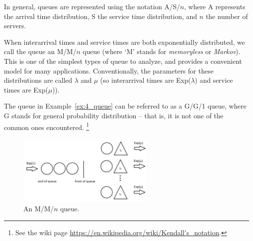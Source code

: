 In general, queues are represented using the notation A/S/$n$, where A represents the arrival time distribution, S the service time distribution, and $n$ the number of servers.

When interarrival times and service times are both exponentially distributed, we call the queue an M/M/$n$ queue (where `M' stands for \emph{memoryless} or \emph{Markov}).
This is one of the simplest types of queue to analyze, and provides a convenient model for many applications.
Conventionally, the parameters for these distributions are called $\lambda$ and $\mu$ (so interarrival times are Exp($\lambda$) and service times are Exp($\mu$)).


The queue in Example~\ref{ex:4_queue} can be referred to as a G/G/1 queue, where G stands for general probability distribution -- that is, it is not one of the common ones encountered.
\footnote{See the wiki page \url{https://en.wikipedia.org/wiki/Kendall's\_notation}.}

\begin{figure}[htbp]
	\centering
	\includegraphics[width=0.6\textwidth]{fig/4_queuepaintMMn.png}
	\caption{An M/M/$n$ queue. \label{fig:4_queuepaintMMn}}
\end{figure}


